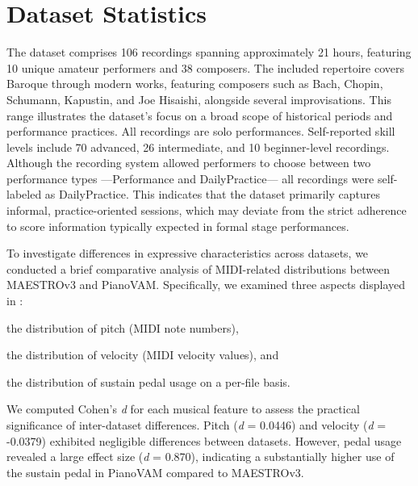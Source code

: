 \documentclass{article}
\begin{document}
\section{Dataset Statistics}\label{sec:dataset-statistics}

The dataset comprises 106 recordings spanning approximately 21 hours, featuring 10 unique amateur performers and 38 composers. The included repertoire covers Baroque through modern works, featuring composers such as Bach, Chopin, Schumann, Kapustin, and Joe Hisaishi, alongside several improvisations. This range illustrates the dataset's focus on a broad scope of historical periods and performance practices. All recordings are solo performances. Self-reported skill levels include 70 advanced, 26 intermediate, and 10 beginner-level recordings. Although the recording system allowed performers to choose between two performance types ---Performance and DailyPractice--- all recordings were self-labeled as DailyPractice. This indicates that the dataset primarily captures informal, practice-oriented sessions, which may deviate from the strict adherence to score information typically expected in formal stage performances. 

To investigate differences in expressive characteristics across datasets, we conducted a brief comparative analysis of MIDI-related distributions between MAESTROv3 and PianoVAM. Specifically, we examined three aspects displayed in : 
\begin{inparaenum}[(i)]
    \item the distribution of pitch (MIDI note numbers), 
    \item the distribution of velocity (MIDI velocity values), and 
    \item the distribution of sustain pedal usage on a per-file basis.
\end{inparaenum}
We computed Cohen's \textit{d} for each musical feature to assess the practical significance of inter-dataset differences.  Pitch (\textit{d} = 0.0446) and velocity (\textit{d} = -0.0379) exhibited negligible differences between datasets. However, pedal usage revealed a large effect size (\textit{d} = 0.870), indicating a substantially higher use of the sustain pedal in PianoVAM compared to MAESTROv3. 
 

\end{document}
